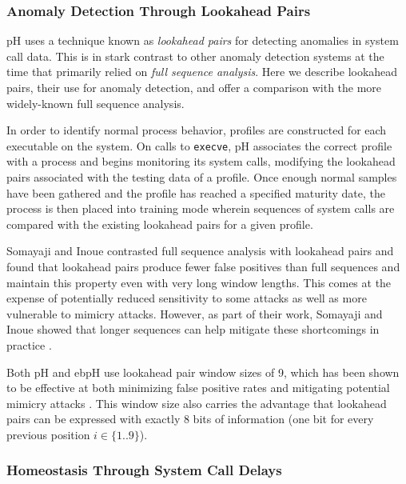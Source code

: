 \documentclass[
  12pt]{findlay}
\newcommand{\passthrough}[1]{#1}
\begin{document}
\hypertarget{anomaly-detection-through-lookahead-pairs}{%
\subsubsection{Anomaly Detection Through Lookahead
Pairs}\label{anomaly-detection-through-lookahead-pairs}}

\label{ph-lap}

pH uses a technique known as \emph{lookahead pairs}
\autocite{soma02,soma07} for detecting anomalies in system call data.
This is in stark contrast to other anomaly detection systems at the time
that primarily relied on \emph{full sequence analysis}. Here we describe
lookahead pairs, their use for anomaly detection, and offer a comparison
with the more widely-known full sequence analysis.

In order to identify normal process behavior, profiles are constructed
for each executable on the system. On calls to
\passthrough{\lstinline!execve!}, pH associates the correct profile with
a process and begins monitoring its system calls, modifying the
lookahead pairs associated with the testing data of a profile. Once
enough normal samples have been gathered and the profile has reached a
specified maturity date, the process is then placed into training mode
wherein sequences of system calls are compared with the existing
lookahead pairs for a given profile.

Somayaji and Inoue \autocite{soma07} contrasted full sequence analysis
with lookahead pairs and found that lookahead pairs produce fewer false
positives than full sequences and maintain this property even with very
long window lengths. This comes at the expense of potentially reduced
sensitivity to some attacks as well as more vulnerable to mimicry
attacks. However, as part of their work, Somayaji and Inoue showed that
longer sequences can help mitigate these shortcomings in practice
\autocite{soma07}.

Both pH and ebpH use lookahead pair window sizes of 9, which has been
shown to be effective at both minimizing false positive rates and
mitigating potential mimicry attacks \autocite{soma02}. This window size
also carries the advantage that lookahead pairs can be expressed with
exactly 8 bits of information (one bit for every previous position
\(i \in \{1..9\}\)).

\hypertarget{homeostasis-through-system-call-delays}{%
\subsubsection{Homeostasis Through System Call
Delays}\label{homeostasis-through-system-call-delays}}
\end{document}
